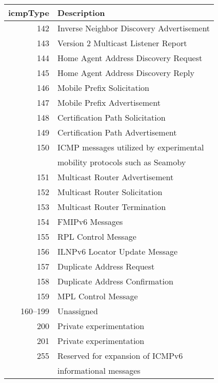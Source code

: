 \documentclass[documentation]{subfiles}
\begin{document}
\begin{small}
\begin{minipage}{.48\textwidth}
\begin{longtable}{rl}
            {\bf icmpType} & {\bf Description}\\
            \midrule\endhead%
            142 & Inverse Neighbor Discovery Advertisement \\
            143 & Version 2 Multicast Listener Report\\
            144 & Home Agent Address Discovery Request \\
            145 & Home Agent Address Discovery Reply \\
            146 & Mobile Prefix Solicitation\\
            147 & Mobile Prefix Advertisement\\
            148 & Certification Path Solicitation \\
            149 & Certification Path Advertisement \\
            150 & ICMP messages utilized by experimental \\
                & mobility protocols such as Seamoby\\
            151 & Multicast Router Advertisement\\
            152 & Multicast Router Solicitation\\
            153 & Multicast Router Termination\\
            154 & FMIPv6 Messages\\
            155 & RPL Control Message\\
            156 & ILNPv6 Locator Update Message\\
            157 & Duplicate Address Request\\
            158 & Duplicate Address Confirmation\\
            159 & MPL Control Message\\
            160--199 & Unassigned\\
            200 & Private experimentation\\
            201 & Private experimentation\\
            255 & Reserved for expansion of ICMPv6\\
                & informational messages\\
            \bottomrule
        \end{longtable}
    \end{minipage}
\end{small}

\paragraph{}
\end{document}
